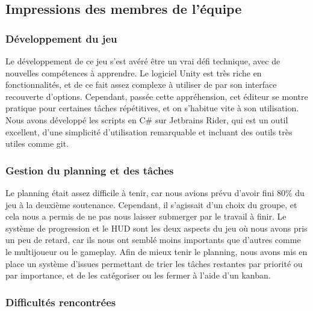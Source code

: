 \subsection{Impressions des membres de l'équipe}

    \vspace{0.5cm}
    \subsubsection{Développement du jeu}
    \vspace{0.5cm}

        Le développement de ce jeu s'est avéré être un vrai défi technique, avec de nouvelles compétences à apprendre. 
        Le logiciel Unity est très riche en fonctionnalités, et de ce fait assez complexe à utiliser de par son interface 
        recouverte d'options. Cependant, passée cette appréhension, cet éditeur se montre pratique pour certaines tâches répétitives, et 
        on s'habitue vite à son utilisation. Nous avons développé les scripts en C\# sur Jetbrains Rider, qui est un outil 
        excellent, d'une simplicité d'utilisation remarquable et incluant des outils très utiles comme git. 


    \vspace{0.5cm}
    \subsubsection{Gestion du planning et des tâches}
    \vspace{0.5cm}

        Le planning était assez difficile à tenir, car nous avions prévu d'avoir fini 80\% du jeu à la deuxième soutenance. 
        Cependant, il s'agissait d'un choix du groupe, et cela nous a permis de ne pas nous laisser submerger par le travail 
        à finir. Le système de progression et le HUD sont les deux aspects du jeu où nous avons pris un peu de retard, car ils nous ont 
        semblé moins importants que d'autres comme le multijoueur ou le gameplay. Afin de mieux tenir le planning, nous avons mis en place 
        un système d'issues permettant de trier les tâches restantes par priorité ou par importance, et de les catégoriser ou les fermer à l'aide 
        d'un kanban. 


    \vspace{0.5cm}
    \subsubsection{Difficultés rencontrées}
    \vspace{0.5cm}

